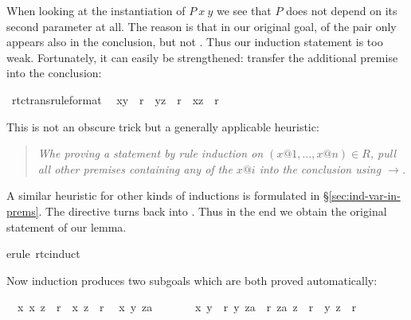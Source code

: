 \begin{isabellebody}
\begin{isamarkuptxt}
When looking at the instantiation of $P~x~y$ we see
that $P$ does not depend on its second parameter at
all. The reason is that in our original goal, of the pair  only
 appears also in the conclusion, but not . Thus our
induction statement is too weak. Fortunately, it can easily be strengthened:
transfer the additional premise  into the conclusion:%
\end{isamarkuptxt}%
\ rtc{\isacharunderscore}trans{\isacharbrackleft}rule{\isacharunderscore}format{\isacharbrackright}{\isacharcolon}\isanewline
\ \ {\isachardoublequote}{\isacharparenleft}x{\isacharcomma}y{\isacharparenright}\ {\isasymin}\ r{\isacharasterisk}\ {\isasymLongrightarrow}\ {\isacharparenleft}y{\isacharcomma}z{\isacharparenright}\ {\isasymin}\ r{\isacharasterisk}\ {\isasymlongrightarrow}\ {\isacharparenleft}x{\isacharcomma}z{\isacharparenright}\ {\isasymin}\ r{\isacharasterisk}{\isachardoublequote}%
\begin{isamarkuptxt}%
\noindent
This is not an obscure trick but a generally applicable heuristic:
\begin{quote}\em
Whe proving a statement by rule induction on $(x@1,\dots,x@n) \in R$,
pull all other premises containing any of the $x@i$ into the conclusion
using $\longrightarrow$.
\end{quote}
A similar heuristic for other kinds of inductions is formulated in
\S\ref{sec:ind-var-in-prems}. The  directive turns
\isa{{\isasymlongrightarrow}} back into \isa{{\isasymLongrightarrow}}. Thus in the end we obtain the original
statement of our lemma.%
\end{isamarkuptxt}%
erule\ rtc{\isachardot}induct{\isacharparenright}%
\begin{isamarkuptxt}%
\noindent
Now induction produces two subgoals which are both proved automatically:
\begin{isabelle}%
\ {}{\isachardot}\ {\isasymAnd}x{\isachardot}\ {\isacharparenleft}x{\isacharcomma}\ z{\isacharparenright}\ {\isasymin}\ r{\isacharasterisk}\ {\isasymlongrightarrow}\ {\isacharparenleft}x{\isacharcomma}\ z{\isacharparenright}\ {\isasymin}\ r{\isacharasterisk}\isanewline
\ {}{\isachardot}\ {\isasymAnd}x\ y\ za{\isachardot}\isanewline
\ \ \ \ \ \ \ {\isasymlbrakk}{\isacharparenleft}x{\isacharcomma}\ y{\isacharparenright}\ {\isasymin}\ r{\isacharsemicolon}\ {\isacharparenleft}y{\isacharcomma}\ za{\isacharparenright}\ {\isasymin}\ r{\isacharasterisk}{\isacharsemicolon}\ {\isacharparenleft}za{\isacharcomma}\ z{\isacharparenright}\ {\isasymin}\ r{\isacharasterisk}\ {\isasymlongrightarrow}\ {\isacharparenleft}y{\isacharcomma}\ z{\isacharparenright}\ {\isasymin}\ r{\isacharasterisk}{\isasymrbrakk}\isanewline

\end{isabelle}
\end{isamarkuptxt}
\end{isabellebody}
